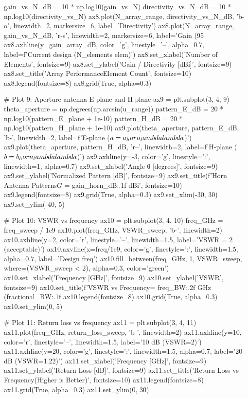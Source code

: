 \documentclass[a4paper, 11pt]{article}
\begin{document}
\begin{pycode}
gain_vs_N_dB = 10 * np.log10(gain_vs_N)
directivity_vs_N_dB = 10 * np.log10(directivity_vs_N)
ax8.plot(N_array_range, directivity_vs_N_dB, 'b-o', linewidth=2, markersize=6, label='Directivity')
ax8.plot(N_array_range, gain_vs_N_dB, 'r-s', linewidth=2, markersize=6, label='Gain (95%
ax8.axhline(y=gain_array_dB, color='g', linestyle='--', alpha=0.7,
            label=f'Current design ({N_elements} elem)')
ax8.set_xlabel('Number of Elements', fontsize=9)
ax8.set_ylabel('Gain / Directivity [dBi]', fontsize=9)
ax8.set_title('Array Performance\nvs Element Count', fontsize=10)
ax8.legend(fontsize=8)
ax8.grid(True, alpha=0.3)

# Plot 9: Aperture antenna E-plane and H-plane
ax9 = plt.subplot(3, 4, 9)
theta_aperture = np.degrees(np.arcsin(u_range))
pattern_E_dB = 20 * np.log10(pattern_E_plane + 1e-10)
pattern_H_dB = 20 * np.log10(pattern_H_plane + 1e-10)
ax9.plot(theta_aperture, pattern_E_dB, 'b-', linewidth=2, label=f'E-plane ($a={a_horn_lambda}\\lambda$)')
ax9.plot(theta_aperture, pattern_H_dB, 'r--', linewidth=2, label=f'H-plane ($b={b_horn_lambda}\\lambda$)')
ax9.axhline(y=-3, color='g', linestyle=':', linewidth=1, alpha=0.7)
ax9.set_xlabel('Angle θ [degrees]', fontsize=9)
ax9.set_ylabel('Normalized Pattern [dB]', fontsize=9)
ax9.set_title(f'Horn Antenna Patterns\n$G$ = {gain_horn_dB:.1f} dBi', fontsize=10)
ax9.legend(fontsize=8)
ax9.grid(True, alpha=0.3)
ax9.set_xlim(-30, 30)
ax9.set_ylim(-40, 5)

# Plot 10: VSWR vs frequency
ax10 = plt.subplot(3, 4, 10)
freq_GHz = freq_sweep / 1e9
ax10.plot(freq_GHz, VSWR_sweep, 'b-', linewidth=2)
ax10.axhline(y=2, color='r', linestyle='--', linewidth=1.5, label='VSWR = 2 (acceptable)')
ax10.axvline(x=freq/1e9, color='g', linestyle=':', linewidth=1.5, alpha=0.7, label='Design freq')
ax10.fill_between(freq_GHz, 1, VSWR_sweep, where=(VSWR_sweep < 2), alpha=0.3, color='green')
ax10.set_xlabel('Frequency [GHz]', fontsize=9)
ax10.set_ylabel('VSWR', fontsize=9)
ax10.set_title(f'VSWR vs Frequency\nBW = {freq_BW:.2f} GHz ({fractional_BW:.1f}%
ax10.legend(fontsize=8)
ax10.grid(True, alpha=0.3)
ax10.set_ylim(0, 5)

# Plot 11: Return loss vs frequency
ax11 = plt.subplot(3, 4, 11)
ax11.plot(freq_GHz, return_loss_sweep, 'b-', linewidth=2)
ax11.axhline(y=10, color='r', linestyle='--', linewidth=1.5, label='10 dB (VSWR=2)')
ax11.axhline(y=20, color='g', linestyle=':', linewidth=1.5, alpha=0.7, label='20 dB (VSWR=1.22)')
ax11.set_xlabel('Frequency [GHz]', fontsize=9)
ax11.set_ylabel('Return Loss [dB]', fontsize=9)
ax11.set_title('Return Loss vs Frequency\n(Higher is Better)', fontsize=10)
ax11.legend(fontsize=8)
ax11.grid(True, alpha=0.3)
ax11.set_ylim(0, 30)


\end{pycode}
\end{document}
